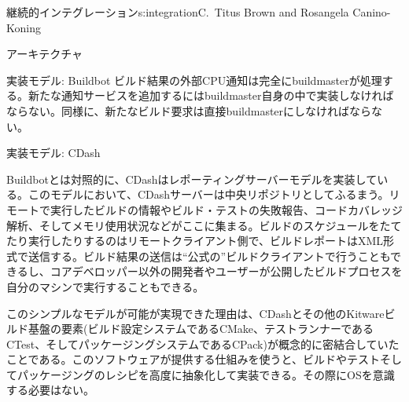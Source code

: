\begin{aosachapter}{継続的インテグレーション}{s:integration}{C.\ Titus Brown and Rosangela Canino-Koning}
\begin{aosasect1}{アーキテクチャ}
\begin{aosasect2}{実装モデル: Buildbot}
ビルド結果の外部CPU通知は完全にbuildmasterが処理する。新たな通知サービスを追加するにはbuildmaster自身の中で実装しなければならない。同様に、新たなビルド要求は直接buildmasterにしなければならない。

\end{aosasect2}

\begin{aosasect2}{実装モデル: CDash}


Buildbotとは対照的に、CDashはレポーティングサーバーモデルを実装している。このモデルにおいて、CDashサーバーは中央リポジトリとしてふるまう。リモートで実行したビルドの情報やビルド・テストの失敗報告、コードカバレッジ解析、そしてメモリ使用状況などがここに集まる。ビルドのスケジュールをたてたり実行したりするのはリモートクライアント側で、ビルドレポートはXML形式で送信する。ビルド結果の送信は``公式の''ビルドクライアントで行うこともできるし、コアデベロッパー以外の開発者やユーザーが公開したビルドプロセスを自分のマシンで実行することもできる。

このシンプルなモデルが可能が実現できた理由は、CDashとその他のKitwareビルド基盤の要素(ビルド設定システムであるCMake、テストランナーであるCTest、そしてパッケージングシステムであるCPack)が概念的に密結合していたことである。このソフトウェアが提供する仕組みを使うと、ビルドやテストそしてパッケージングのレシピを高度に抽象化して実装できる。その際にOSを意識する必要はない。


\end{aosasect2}
\end{aosasect1}
\end{aosachapter}
